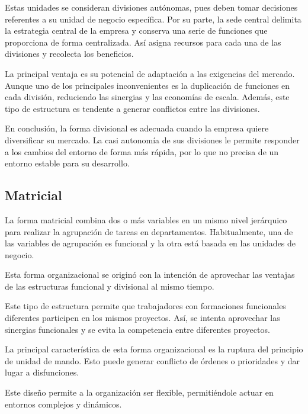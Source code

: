 \documentclass[12pt,a4paper,spanish]{report}
\begin{document}
			Estas unidades se consideran divisiones autónomas, pues deben tomar decisiones referentes a su unidad de negocio específica. Por su parte, la sede central delimita la estrategia central de la empresa y conserva una serie de funciones que proporciona de forma centralizada. Así asigna recursos para cada una de las divisiones y recolecta los beneficios.

			La principal ventaja es su potencial de adaptación a las exigencias del mercado. Aunque uno de los principales inconvenientes es la duplicación de funciones en cada división, reduciendo las sinergias y las economías de escala. Además, este tipo de estructura es tendente a generar conflictos entre las divisiones.

			En conclusión, la forma divisional es adecuada cuando la empresa quiere diversificar su mercado. La casi autonomía de sus divisiones le permite responder a los cambios del entorno de forma más rápida, por lo que no precisa de un entorno estable para su desarrollo.

		\subsection{\textcolor[rgb]{0.5,0.1,0.4}Matricial}
			La forma matricial combina dos o más variables en un mismo nivel jerárquico para realizar la agrupación de tareas en departamentos. Habitualmente, una de las variables de agrupación es funcional y la otra está basada en las unidades de negocio.

			Esta forma organizacional se originó con la intención de aprovechar las ventajas de las estructuras funcional y divisional al mismo tiempo.

			Este tipo de estructura permite que trabajadores con formaciones funcionales diferentes participen en los mismos proyectos. Así, se intenta aprovechar las sinergias funcionales y se evita la competencia entre diferentes proyectos.

			La principal característica de esta forma organizacional es la ruptura del principio de unidad de mando. Esto puede generar conflicto de órdenes o prioridades y dar lugar a disfunciones.

			Este diseño permite a la organización ser flexible, permitiéndole actuar en entornos complejos y dinámicos.
\end{document}
